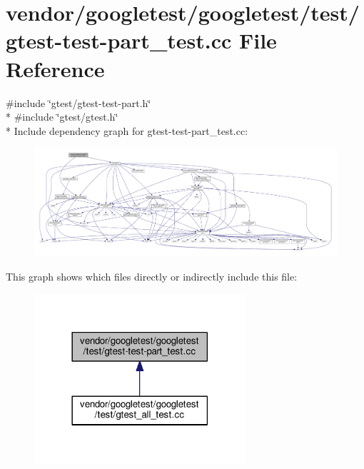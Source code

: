 \hypertarget{gtest-test-part__test_8cc}{}\section{vendor/googletest/googletest/test/gtest-\/test-\/part\+\_\+test.cc File Reference}
\label{gtest-test-part__test_8cc}
{\ttfamily \#include \char`\"{}gtest/gtest-\/test-\/part.\+h\char`\"{}}\\*
{\ttfamily \#include \char`\"{}gtest/gtest.\+h\char`\"{}}\\*
Include dependency graph for gtest-\/test-\/part\+\_\+test.cc\+:
\nopagebreak
\begin{figure}[H]
\begin{center}
\leavevmode
\includegraphics[width=350pt]{gtest-test-part__test_8cc__incl}
\end{center}
\end{figure}
This graph shows which files directly or indirectly include this file\+:
\nopagebreak
\begin{figure}[H]
\begin{center}
\leavevmode
\includegraphics[width=222pt]{gtest-test-part__test_8cc__dep__incl}
\end{center}
\end{figure}
